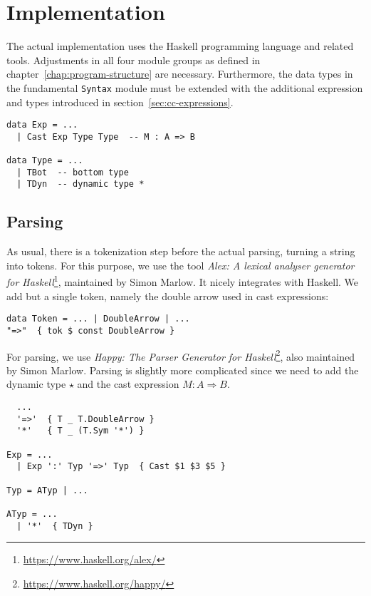 \chapter{Implementation}\label{chap:implementation}

The actual implementation uses the Haskell programming language and related tools. Adjustments in all four module groups as defined in chapter~\ref{chap:program-structure} are necessary. Furthermore, the data types in the fundamental \texttt{Syntax} module must be extended with the additional expression and types introduced in section~\ref{sec:cc-expressions}.

\begin{lstlisting}[caption=Syntax.hs]
data Exp = ...
  | Cast Exp Type Type  -- M : A => B

data Type = ...
  | TBot  -- bottom type
  | TDyn  -- dynamic type *
\end{lstlisting}

\section{Parsing}

As usual, there is a tokenization step before the actual parsing, turning a string into tokens. For this purpose, we use the tool \emph{Alex: A lexical analyser generator for Haskell}\footnote{\url{https://www.haskell.org/alex/}}, maintained by Simon Marlow. It nicely integrates with Haskell. We add but a single token, namely the double arrow used in cast expressions:

\begin{lstlisting}[caption=Parsing/Tokens.x]
data Token = ... | DoubleArrow | ...
"=>"  { tok $ const DoubleArrow }
\end{lstlisting}

For parsing, we use \emph{Happy: The Parser Generator for Haskell}\footnote{\url{https://www.haskell.org/happy/}}, also maintained by Simon Marlow. Parsing is slightly more complicated since we need to add the dynamic type $\star$ and the cast expression $M : A \Rightarrow B$.

\begin{lstlisting}[caption=Parsing/Grammar.y]
%token
  ...
  '=>'  { T _ T.DoubleArrow }
  '*'   { T _ (T.Sym '*') }

Exp = ...
  | Exp ':' Typ '=>' Typ  { Cast $1 $3 $5 }

Typ = ATyp | ...

ATyp = ...
  | '*'  { TDyn }
\end{lstlisting}
